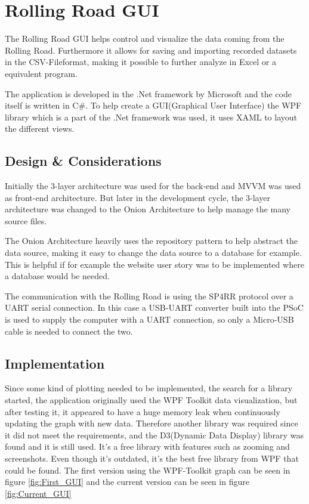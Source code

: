 \section{Rolling Road GUI}

The Rolling Road GUI helps control and visualize the data coming from the Rolling Road. Furthermore it allows for saving and importing recorded datasets in the CSV-Fileformat, making it possible to further analyze in Excel or a equivalent program.

The application is developed in the .Net framework by Microsoft and the code itself is written in C\#.
To help create a GUI(Graphical User Interface) the WPF library which is a part of the .Net framework was used, it uses XAML to layout the different views.

\subsection{Design \& Considerations}
Initially the 3-layer architecture was used for the back-end and MVVM was used as front-end architecture. But later in the development cycle, the 3-layer architecture was changed to the Onion Architecture to help manage the many source files.

The Onion Architecture heavily uses the repository pattern to help abstract the data source, making it easy to change the data source to a database for example. This is helpful if for example the website user story was to be implemented where a database would be needed.

The communication with the Rolling Road is using the SP4RR protocol over a UART serial connection. In this case a USB-UART converter built into the PSoC is used to supply the computer with a UART connection, so only a Micro-USB cable is needed to connect the two.

\subsection{Implementation}
Since some kind of plotting needed to be implemented, the search for a library started, the application originally used the WPF Toolkit data visualization\cite{WPf_Toolkit}, but after testing it, it appeared to have a huge memory leak when continuously updating the graph with new data. Therefore another library was required since it did not meet the requirements, and the D3(Dynamic Data Display) library\cite{WPf_D3} was found and it is still used. It's a free library with features such as zooming and screenshots. Even though it's outdated, it's the best free library from WPF that could be found. The first version using the WPF-Toolkit graph can be seen in figure \vref{fig:First_GUI} and the current version can be seen in figure \vref{fig:Current_GUI}

